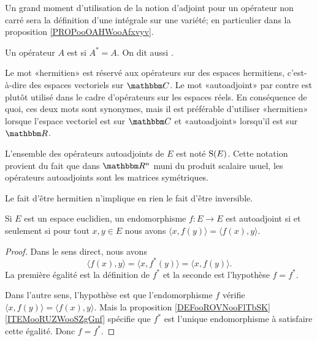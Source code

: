 \begin{normaltext}
    Un grand moment d'utilisation de la notion d'adjoint pour un opérateur non carré sera la définition d'une intégrale sur une variété; en particulier dans la proposition \ref{PROPooOAHWooAfxvyv}.
\end{normaltext}

\begin{definition}      \label{DEFooKEBHooWwCKRK}
    Un opérateur \( A\) est  si \( A^*=A\). On dit aussi .
\end{definition}

\begin{normaltext}
    Le mot «hermitien» est réservé aux opérateurs sur des espaces hermitiens, c'est-à-dire des espaces vectoriels sur \( \eC\). Le mot «autoadjoint» par contre est plutôt utilisé dans le cadre d'opérateurs sur les espaces réels. En conséquence de quoi, ces deux mots sont synonymes, mais il est préférable d'utiliser «hermitien» lorsque l'espace vectoriel est sur \( \eC\) et «autoadjoint» lorsqu'il est sur \( \eR\).

    L'ensemble des opérateurs autoadjoints de \( E\) est noté \( \operatorname{S}(E)\). Cette notation provient du fait que dans \( \eR^n\) muni du produit scalaire usuel, les opérateurs autoadjoints sont les matrices symétriques.
\end{normaltext}

\begin{remark}
    Le fait d'être hermitien n'implique en rien le fait d'être inversible.
\end{remark}

\begin{lemma}
    Si \( E\) est un espace euclidien, un endomorphisme \( f\colon E\to E\) est autoadjoint si et seulement si pour tout \( x,y\in E\) nous avons \( \langle x, f(y)\rangle=\langle f(x), y\rangle  \).
\end{lemma}

\begin{proof}
    Dans le sens direct, nous avons
    \begin{equation}
        \langle f(x), y\rangle =\langle x, f^*(y)\rangle =\langle x, f(y)\rangle .
    \end{equation}
    La première égalité est la définition de \( f^*\) et la seconde est l'hypothèse \( f=f^*\).

    Dans l'autre sens, l'hypothèse est que l'endomorphisme \( f\) vérifie \( \langle x, f(y)\rangle =\langle f(x), y\rangle \). Mais la proposition \ref{DEFooROVNooFlTbSK}\ref{ITEMooRUZWooSZgGnf} spécifie que \( f^*\) est l'unique endomorphisme à satisfaire cette égalité. Donc \( f=f^*\).
\end{proof}

